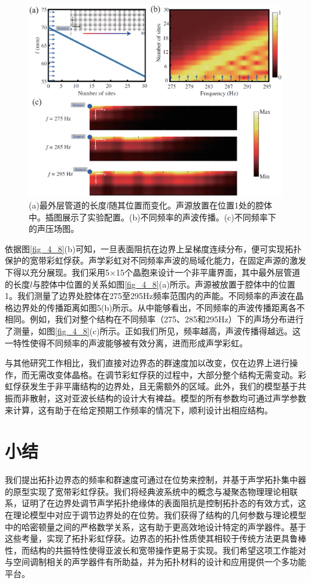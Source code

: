 \begin{figure}[h!]
    \centering
    \includegraphics[width=1\textwidth]{images/fig4-9.eps} 
    \caption{(a)最外层管道的长度$l$随其位置而变化。声源放置在位置1处的腔体中。插图展示了实验配置。(b)不同频率的声波传播。(c)不同频率下的声压场图。}
    \label{fig_4_9}
\end{figure} 

依据图\ref{fig_4_8}(b)可知，一旦表面阻抗在边界上呈梯度连续分布，便可实现拓扑保护的宽带彩虹俘获\cite{C41-1,C41-2,C41-3}。声学彩虹对不同频率声波的局域化能力，在固定声源的激发下得以充分展现。我们采用5×15个晶胞来设计一个非平庸界面，其中最外层管道的长度$l$与腔体中位置的关系如图\ref{fig_4_8}(a)所示。声源被放置于腔体中的位置1。我们测量了边界处腔体在275至295Hz频率范围内的声能。不同频率的声波在晶格边界处的传播距离如图5(b)所示。从中能够看出，不同频率的声波传播距离各不相同。例如，我们对整个结构在不同频率（275、285和295Hz）下的声场分布进行了测量，如图\ref{fig_4_8}(c)所示。正如我们所见，频率越高，声波传播得越远。这一特性使得不同频率的声波能够被有效分离，进而形成声学彩虹。

与其他研究工作相比，我们直接对边界态的群速度加以改变，仅在边界上进行操作，而无需改变体晶格。在调节彩虹俘获的过程中，大部分整个结构无需变动。彩虹俘获发生于非平庸结构的边界处，且无需额外的区域。此外，我们的模型基于共振而非散射，这对亚波长结构的设计大有裨益。模型的所有参数均可通过声学参数来计算，这有助于在给定预期工作频率的情况下，顺利设计出相应结构。

\section{小结}

我们提出拓扑边界态的频率和群速度可通过在位势来控制，并基于声学拓扑集中器的原型实现了宽带彩虹俘获。我们将经典波系统中的概念与凝聚态物理理论相联系，证明了在边界处调节声学拓扑绝缘体的表面阻抗是控制拓扑态的有效方式，这在理论模型中对应于调节边界处的在位势。我们获得了结构的几何参数与理论模型中的哈密顿量之间的严格数学关系，这有助于更高效地设计特定的声学器件。基于这些考量，实现了拓扑彩虹俘获。边界态的拓扑性质使其相较于传统方法更具鲁棒性，而结构的共振特性使得亚波长和宽带操作更易于实现。我们希望这项工作能对与空间调制相关的声学器件有所助益，并为拓扑材料的设计和应用提供一个多功能平台。